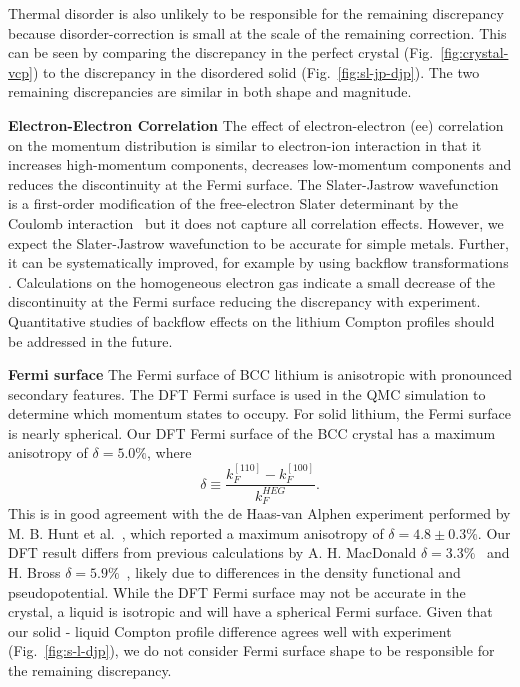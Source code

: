 Thermal disorder is also unlikely to be responsible for the remaining discrepancy because disorder-correction is small at the scale of the remaining correction. This can be seen by comparing the discrepancy in the perfect crystal (Fig.~\ref{fig:crystal-vcp}) to the discrepancy in the disordered solid (Fig.~\ref{fig:sl-jp-djp}). The two remaining discrepancies are similar in both shape and magnitude.

{\bf Electron-Electron Correlation}  The effect of electron-electron (ee) correlation on the momentum distribution is similar to electron-ion interaction in that it increases high-momentum components, decreases low-momentum components and reduces the discontinuity at the Fermi surface. The Slater-Jastrow wavefunction is a first-order modification of the free-electron Slater determinant by the Coulomb interaction~\cite{Holzmann2003} but it does not capture all correlation effects.
However, we expect the Slater-Jastrow wavefunction to be accurate for simple metals. 
Further, it can be systematically improved, for example by using backflow transformations \cite{PhysRevB.91.115106}. 
Calculations on the homogeneous electron gas indicate a small decrease of the discontinuity
at the Fermi 
surface \cite{Holzmann2011} reducing the discrepancy with experiment. Quantitative studies of
backflow effects on the lithium Compton profiles should be addressed in the future.

{\bf Fermi surface}  The Fermi surface of BCC lithium is anisotropic with pronounced secondary features. The DFT Fermi surface is used in the QMC simulation to determine which momentum states to occupy.
For solid lithium, the Fermi surface is nearly spherical. Our DFT Fermi surface of the BCC crystal has a maximum anisotropy of $\delta=5.0\%$, where
\begin{equation} \label{eq:ani-delta}
\delta \equiv \dfrac{k_F^{[110]} - k_F^{[100]}}{k_F^{HEG}}.
\end{equation}
This is in good agreement with the de Haas-van Alphen experiment performed by M. B. Hunt et al.~\cite{Hunt1989}, which reported a maximum anisotropy of $\delta=4.8\pm 0.3\%$. Our DFT result differs from previous calculations by A. H. MacDonald $\delta=3.3\%$~\cite{MacDonald1980} and H. Bross $\delta=5.9\%$~\cite{Bross2005}, likely due to differences in the density functional and pseudopotential.
While the DFT Fermi surface may not be accurate in the crystal,  a liquid is isotropic and will have a spherical Fermi surface.
Given that our solid - liquid Compton profile difference agrees well with experiment (Fig.~\ref{fig:s-l-djp}), we do not consider Fermi surface shape to be responsible for the remaining discrepancy.

